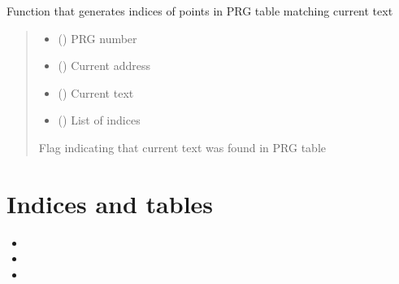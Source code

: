 \documentclass[letterpaper,10pt,english]{sphinxmanual}
\begin{document}
\begin{fulllineitems}
\label{\detokenize{geo_gui:geo_gui.get_prg_ids}}
\pysigstartsignatures
{}
\pysigstopsignatures
\sphinxAtStartPar
Function that generates indices of points in PRG table matching current text
\begin{quote}\begin{description}
\begin{itemize}
\item {} 
\sphinxAtStartPar
{} () \textendash{} PRG number

\item {} 
\sphinxAtStartPar
{} () \textendash{} Current address

\item {} 
\sphinxAtStartPar
{} () \textendash{} Current text

\item {} 
\sphinxAtStartPar
{} (\sphinxcode{\sphinxupquote{List}}{[}\sphinxcode{\sphinxupquote{str}}{]}) \textendash{} List of indices

\end{itemize}

\sphinxAtStartPar
{}

\sphinxAtStartPar
Flag indicating that current text was found in PRG table

\end{description}\end{quote}

\end{fulllineitems}



\chapter{Indices and tables}
\label{\detokenize{index:indices-and-tables}}\begin{itemize}
\item {} 
\sphinxAtStartPar
{}

\item {} 
\sphinxAtStartPar
{}

\item {} 
\sphinxAtStartPar
{}

\end{itemize}
\end{document}
